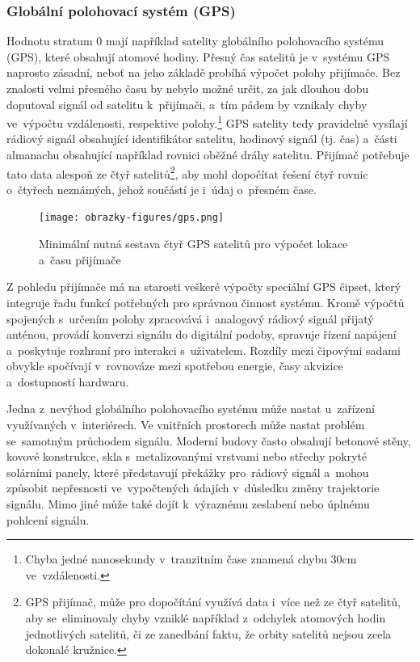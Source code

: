 \subsubsection{Globální polohovací systém (GPS)}
Hodnotu stratum 0 mají například satelity globálního polohovacího systému (GPS), které obsahují atomové hodiny. Přesný čas satelitů je v~systému GPS naprosto zásadní, neboť na jeho základě probíhá výpočet polohy přijímače. Bez znalosti velmi přesného času by nebylo možné určit, za jak dlouhou dobu doputoval signál od satelitu k~přijímači, a~tím pádem by vznikaly chyby ve~výpočtu vzdálenosti, respektive polohy.\footnote{Chyba jedné nanosekundy v~tranzitním čase znamená chybu 30cm ve~vzdálenosti.} GPS satelity tedy pravidelně vysílají rádiový signál obsahující identifikátor satelitu, hodinový signál (tj. čas) a~části almanachu obsahující například rovnici oběžné dráhy satelitu. Přijímač potřebuje tato data alespoň ze čtyř satelitů\footnote{GPS přijímač, může pro dopočítání využívá data i~více než ze čtyř satelitů, aby se~eliminovaly chyby vzniklé například z~odchylek atomových hodin jednotlivých satelitů, či ze zanedbání faktu, že orbity satelitů nejsou zcela dokonalé kružnice.}, aby mohl dopočítat řešení čtyř rovnic o~čtyřech neznámých, jehož součástí je i~údaj o~přesném čase.~\cite{sparkfun_gps}

\begin{figure}[h]
    \centering
    \texttt{[image: obrazky-figures/gps.png]}
    
    \caption{Minimální nutná sestava čtyř GPS satelitů pro výpočet lokace a~času přijímače~\cite{time_theory_gps}}
    \label{fig:gps}
\end{figure}

Z pohledu přijímače má na starosti veškeré výpočty speciální GPS čipset, který integruje řadu funkcí potřebných pro správnou činnost systému. Kromě výpočtů spojených s~určením polohy zpracovává i~analogový rádiový signál přijatý anténou, provádí konverzi signálu do digitální podoby, spravuje řízení napájení a~poskytuje rozhraní pro interakci s~uživatelem. Rozdíly mezi čipovými sadami obvykle spočívají v~rovnováze mezi spotřebou energie, časy akvizice a~dostupností hardwaru.~\cite{sparkfun_gps}

Jedna z~nevýhod globálního polohovacího systému může nastat u~zařízení využívaných v~interiérech. Ve vnitřních prostorech může nastat problém se~samotným průchodem signálu. Moderní budovy často obsahují betonové stěny, kovové konstrukce, skla s~metalizovanými vrstvami nebo střechy pokryté solárními panely, které představují překážky pro~rádiový signál a~mohou způsobit nepřesnosti ve~vypočtených údajích v~důsledku změny trajektorie signálu. Mimo jiné může také dojít k~výraznému zeslabení nebo úplnému pohlcení signálu.~\cite{sparkfun_gps}


